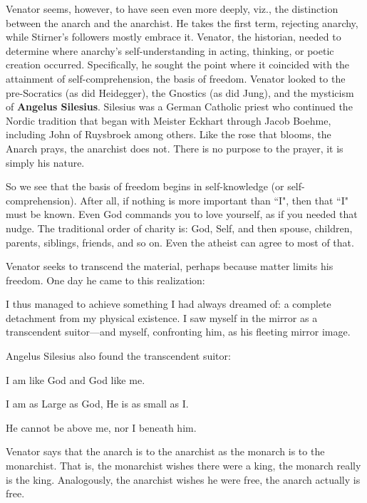 Venator seems, however, to have seen even more deeply, viz., the distinction between the anarch and the anarchist. He takes the first term, rejecting anarchy, while Stirner's followers mostly embrace it. Venator, the historian, needed to determine where anarchy's self-understanding in acting, thinking, or poetic creation occurred. Specifically, he sought the point where it coincided with the attainment of self-comprehension, the basis of freedom. Venator looked to the pre-Socratics (as did Heidegger), the Gnostics (as did Jung), and the mysticism of \textbf{Angelus Silesius}. Silesius was a German Catholic priest who continued the Nordic tradition that began with Meister Eckhart through Jacob Boehme, including John of Ruysbroek among others. Like the rose that blooms, the Anarch prays, the anarchist does not. There is no purpose to the prayer, it is simply his nature.

So we see that the basis of freedom begins in self-knowledge (or self-comprehension). After all, if nothing is more important than ``I", then that ``I" must be known. Even God commands you to love yourself, as if you needed that nudge. The traditional order of charity is: God, Self, and then spouse, children, parents, siblings, friends, and so on. Even the atheist can agree to most of that.

Venator seeks to transcend the material, perhaps because matter limits his freedom. One day he came to this realization:

\begin{quotex}
I thus managed to achieve something I had always dreamed of: a complete detachment from my physical existence. I saw myself in the mirror as a transcendent suitor—and myself, confronting him, as his fleeting mirror image. 

\end{quotex}
Angelus Silesius also found the transcendent suitor:

\begin{quotex}
I am like God and God like me.

I am as Large as God, He is as small as I.

He cannot be above me, nor I beneath him. 

\end{quotex}
Venator says that the anarch is to the anarchist as the monarch is to the monarchist. That is, the monarchist wishes there were a king, the monarch really is the king. Analogously, the anarchist wishes he were free, the anarch actually is free.

